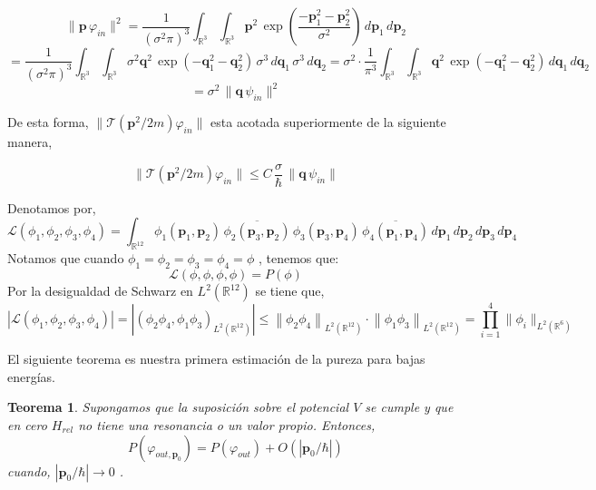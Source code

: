 \documentclass[12pt]{book}
\numberwithin{equation}{chapter}
\newtheorem{theorem}{Teorema}[chapter]
\def\v{\mathbf}
\def\n{\noindent}
\def\ol{\overline}
\def\R{\mathbb{R}}
\def\T{\mathcal{T}}
\def\L{\mathcal{L}}
\def\vp{\varphi}
\def\P{\mathbf{p}}
\begin{document}
$$ \| \P\, \vp_{in}  \|^{2} = \frac{1}{(\sigma^{2} \pi)^{3}} \int_{\R^{3}} \int_{\R^{3}} \P^{2}\, \exp \left( \frac{-\P_{1}^{2} -\P_{2}^{2} }{\sigma^{2}} \right) \, d\P_{1} \, d\P_{2} $$
$$ = \frac{1}{(\sigma^{2} \pi)^{3}} \int_{\R^{3}} \int_{\R^{3}} \sigma^{2} \v{q}^{2}\, \exp \left( -\v{q}_{1}^{2} -\v{q}_{2}^{2}  \right) \, \sigma^{3} \, d\v{q}_{1} \, \sigma^{3} \, d\v{q}_{2} = \sigma^{2} \cdot \frac{1}{\pi^{3}} \int_{\R^{3}} \int_{\R^{3}}  \v{q}^{2}\, \exp \left( -\v{q}_{1}^{2} -\v{q}_{2}^{2}  \right) \, d\v{q}_{1} \, d\v{q}_{2} $$
$$ = \sigma^{2}\, \|\v{q}\, \psi_{in}  \|^{2} $$

\n De esta forma, $\| \T(\P^{2}/2m) \vp_{in}  \|$ esta acotada superiormente de la siguiente manera,

\begin{equation}\label{tau-phi-leq}
\| \T(\P^{2}/2m) \vp_{in}  \| \leq C \, \frac{\sigma}{\hbar} \, \|\v{q}\, \psi_{in}  \|
\end{equation}

Denotamos por,
\begin{equation}\label{lphi}
\L ( \phi_{1},\phi_{2},\phi_{3},\phi_{4} ) = \int_{\R^{12}} \phi_{1}(\P_{1},\P_{2}) \, \ol{ \phi_{2}(\P_{3},\P_{2}) } \, \phi_{3}(\P_{3},\P_{4}) \, \ol{ \phi_{4}(\P_{1},\P_{4}) } \, d\P_{1}\, d\P_{2}\, d\P_{3} \, d\P_{4}
\end{equation}
Notamos que cuando $\phi_{1}= \phi_{2}=\phi_{3}=\phi_{4}=\phi$ , tenemos que:
$$ \L(\phi,\phi,\phi,\phi)= P(\phi) $$
Por la desigualdad de Schwarz en $L^{2}(\R^{12})$ se tiene que,
\begin{equation}\label{lshw}
\left| \L ( \phi_{1},\phi_{2},\phi_{3},\phi_{4} ) \right|=\left| \left(\phi_{2} \phi_{4},\phi_{1} \phi_{3} \right)_{L^{2}(\R^{12})} \right| \leq
\left\| \phi_{2} \phi_{4} \right\|_{L^{2}(\R^{12})} \cdot \left\| \phi_{1} \phi_{3} \right\|_{L^{2}(\R^{12})} = \prod_{i=1}^{4} \| \phi_{i} \|_{L^{2}(\R^{6})}
\end{equation}

\newpage

El siguiente teorema es nuestra primera estimaci\'on de la pureza para bajas energ\'ias.

\begin{theorem}
Supongamos que la suposici\'on sobre el potencial $V$ se cumple y que en cero $H_{rel}$ no tiene una resonancia o un valor propio. Entonces,
\begin{equation}\label{est0}
P (\vp_{out,\P_{0}})= P (\vp_{out})+O(|\P_{0}/\hbar|)
\end{equation}
cuando, $|\P_{0}/\hbar| \rightarrow 0$ .
\end{theorem}
\end{document}
